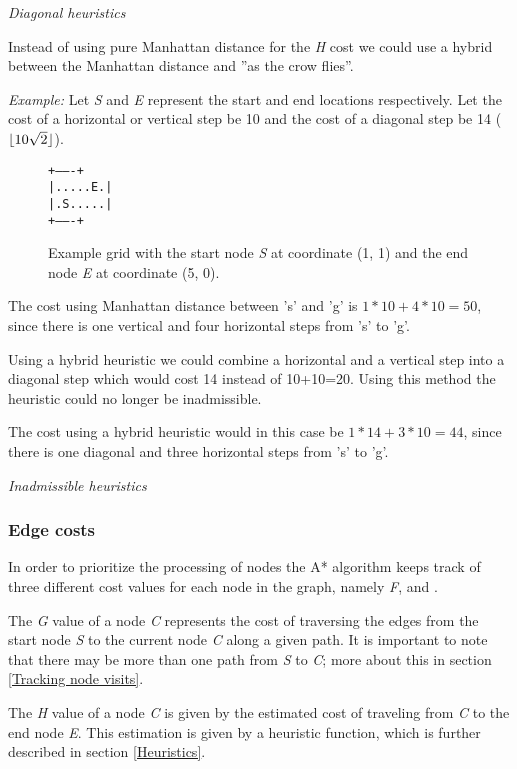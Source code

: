 \documentclass[12pt, a4paper]{article}
\DeclarePairedDelimiter{\floor}{\lfloor}{\rfloor}
\begin{document}
\textit{Diagonal heuristics}

Instead of using pure Manhattan distance for the \textit{H} cost we could use a
hybrid between the Manhattan distance and ''as the crow flies''.

\textit{Example:} Let \textit{S} and \textit{E} represent the start and end
locations respectively. Let the cost of a horizontal or vertical step be 10 and
the cost of a diagonal step be 14 ($ \floor{10 \sqrt{2}} $).

\begin{figure}[htbp]
	\centering
	\texttt{+-------+ \\
|.....E.| \\
|.S.....| \\
+-------+}
	\caption{Example grid with the start node \textit{S} at coordinate (1, 1) and
	the end node \textit{E} at coordinate (5, 0).}
\end{figure}

The cost using Manhattan distance between 's' and 'g' is $ 1*10 + 4*10 = 50 $,
since there is one vertical and four horizontal steps from 's' to 'g'.

Using a hybrid heuristic we could combine a horizontal and a vertical step into
a diagonal step which would cost 14 instead of 10+10=20. Using this method the
heuristic could no longer be inadmissible.

The cost using a hybrid heuristic would in this case be $ 1*14 + 3*10 = 44 $,
since there is one diagonal and three horizontal steps from 's' to 'g'.

\textit{Inadmissible heuristics}


\subsubsection{Edge costs}
\label{Edge costs}

In order to prioritize the processing of nodes the A* algorithm keeps track of
three different cost values for each node in the graph, namely \textit{F},
 and .

The \textit{G} value of a node \textit{C} represents the cost of traversing the
edges from the start node \textit{S} to the current node \textit{C} along a
given path. It is important to note that there may be more than one path from
\textit{S} to \textit{C}; more about this in section \ref{Tracking node visits}.

The \textit{H} value of a node \textit{C} is given by the estimated cost of
traveling from \textit{C} to the end node \textit{E}. This estimation is given
by a heuristic function, which is further described in section \ref{Heuristics}.
\end{document}
